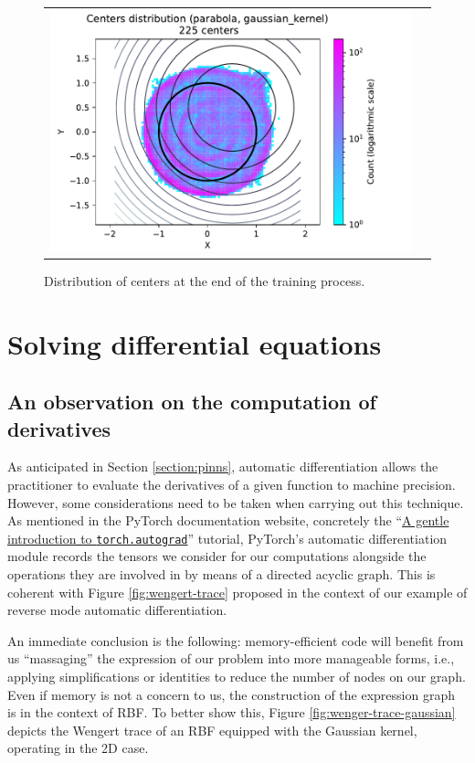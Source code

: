\documentclass[12pt]{report} %
\begin{document}
\begin{figure}[h]
\begin{tabular}{cc}
    \includegraphics[width=.6\textwidth]{imagenes/experiments/2d/statistical_2d_full_scheduler_interpolation/parabola/circle_c225_parabola_gaussian_kernel.pdf}
  \end{tabular}
  \caption{Distribution of centers at the end of the training process.}
  \label{fig:parabola-results-centers}
\end{figure}


\clearpage
\section{Solving differential equations}

\subsection*{An observation on the computation of derivatives}

As anticipated in Section \ref{section:pinns}, automatic differentiation allows the
practitioner to evaluate the derivatives of a given function to machine precision.
However, some considerations need to be taken when carrying out this technique.
As mentioned in the PyTorch documentation website, concretely the
``\href{https://pytorch.org/tutorials/beginner/blitz/autograd_tutorial.html}{A gentle
  introduction to \texttt{torch.autograd}}'' tutorial, PyTorch's automatic differentiation
module records the tensors we consider for our computations alongside the operations
they are involved in by means of a directed acyclic graph. This is coherent with
Figure \ref{fig:wengert-trace} proposed in the context of our example of reverse
mode automatic differentiation.

An immediate conclusion is the following: memory-efficient code will benefit from us
``massaging'' the expression of our problem into more manageable forms, i.e., applying
simplifications or identities to reduce the number of nodes on our graph.
Even if memory is not a concern to us, the construction of the expression graph is
in the context of RBF. To better show this, Figure \ref{fig:wenger-trace-gaussian}
depicts the Wengert trace of an RBF equipped with the Gaussian kernel, operating in the 2D
case.
\end{document}
